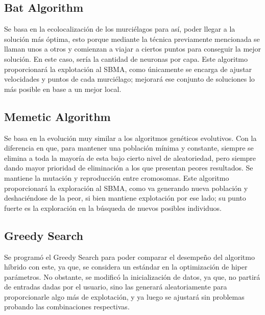 \subsection{Bat Algorithm}
Se basa en la ecolocalización de los murciélagos para así, poder llegar a la solución más óptima, esto porque mediante la técnica previamente mencionada se llaman unos a otros y comienzan a viajar a ciertos puntos para conseguir la mejor solución. En este caso, sería la cantidad de neuronas por capa. Este algoritmo proporcionará la explotación al SBMA, como únicamente se encarga de ajustar velocidades y puntos de cada murciélago; mejorará ese conjunto de soluciones lo más posible en base a un mejor local.

\subsection{Memetic Algorithm}

Se basa en la evolución muy similar a los algoritmos genéticos evolutivos. Con la diferencia en que, para mantener una población mínima y constante, siempre se elimina a toda la mayoría de esta bajo cierto nivel de aleatoriedad, pero siempre dando mayor prioridad de eliminación a los que presentan peores resultados. Se mantiene la mutación y reproducción entre cromosomas. Este algoritmo proporcionará la exploración al SBMA, como va generando nueva población y deshaciéndose de la peor, si bien mantiene explotación por ese lado; su punto fuerte es la exploración en la búsqueda de nuevos posibles individuos.

\subsection{Greedy Search}
Se programó el Greedy Search para poder comparar el desempeño del algoritmo híbrido con este, ya que, se considera un estándar en la optimización de hiper parámetros.
No obstante, se modificó la inicialización de datos, ya que, no partirá de entradas dadas por el usuario, sino las generará aleatoriamente para proporcionarle algo más de explotación, y ya luego se ajustará sin problemas probando las combinaciones respectivas.

